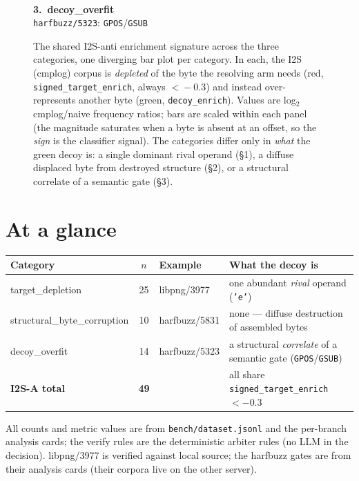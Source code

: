 \documentclass[11pt]{article}
\begin{document}
\begin{figure}[t]
\begin{minipage}[b]{0.31\linewidth}
{}\\[1pt]
{\scriptsize\textbf{3.\ decoy\_overfit}}\\{\tiny\texttt{harfbuzz/5323}: \texttt{GPOS}/\texttt{GSUB}}
\end{minipage}
\caption{The shared I2S-anti enrichment signature across the three categories, one
diverging bar plot per category. In each, the I2S (cmplog) corpus is \emph{depleted}
of the byte the resolving arm needs (red, \texttt{signed\_target\_enrich}, always
$<\!-0.3$) and instead over-represents another byte (green, \texttt{decoy\_enrich}).
Values are log$_2$ cmplog/naive frequency ratios; bars are scaled within each panel
(the magnitude saturates when a byte is absent at an offset, so the \emph{sign} is
the classifier signal). The categories differ only in \emph{what} the green decoy is:
a single dominant rival operand (\S1), a diffuse displaced byte from destroyed
structure (\S2), or a structural correlate of a semantic gate (\S3).}
\label{fig:anti-enrich}
\end{figure}

\section*{At a glance}
\begin{center}\small
\begin{tabular}{@{}p{3.5cm}clp{4.6cm}@{}}
\toprule
\textbf{Category} & \textbf{$n$} & \textbf{Example} & \textbf{What the decoy is} \\
\midrule
target\_depletion & 25 & libpng/3977 & one abundant \emph{rival} operand (\texttt{'e'}) \\
structural\_byte\_corruption & 10 & harfbuzz/5831 & none --- diffuse destruction of assembled bytes \\
decoy\_overfit & 14 & harfbuzz/5323 & a structural \emph{correlate} of a semantic gate (\texttt{GPOS}/\texttt{GSUB}) \\
\midrule
\textbf{I2S-A total} & \textbf{49} & & all share \texttt{signed\_target\_enrich}$<-0.3$ \\
\bottomrule
\end{tabular}
\end{center}

\noindent\footnotesize All counts and metric values are from \texttt{bench/dataset.jsonl}
and the per-branch analysis cards; the verify rules are the deterministic arbiter rules
(no LLM in the decision). libpng/3977 is verified against local source; the harfbuzz gates
are from their analysis cards (their corpora live on the other server).
\end{document}
